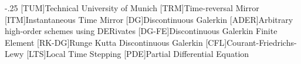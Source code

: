 \documentclass[headsepline,footsepline,footinclude=false,fontsize=11pt,paper=a4,listof=totoc,bibliography=totoc,BCOR=12mm,DIV=12]{scrbook} %
\begin{document}


\frontmatter{}


\cleardoublepage



\tableofcontents{}

\mainmatter{}










\appendix{}


\begin{acronym}
	\itemsep-.25\baselineskip
	[TUM]{Technical University of Munich}
	[TRM]{Time-reversal Mirror}
	[ITM]{Instantaneous Time Mirror}
	[DG]{Discontinuous Galerkin}
	[ADER]{Arbitrary high-order schemes using DERivates}
	[DG-FE]{Discontinuous Galerkin Finite Element}
	[RK-DG]{Runge Kutta Discontinuous Galerkin}
	[CFL]{Courant-Friedrichs-Lewy}
	[LTS]{Local Time Stepping}
	[PDE]{Partial Differential Equation}
\end{acronym}

\listoffigures{}
\listoftables{}
\printbibliography{}
\end{document}
